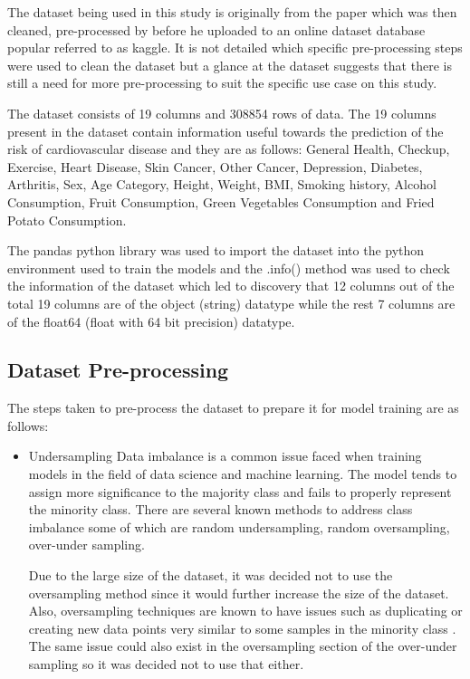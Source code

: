 \documentclass[12pt, a4paper,twoside]{report}
\numberwithin{equation}{chapter}
\begin{document}
The dataset being used in this study is originally from the paper \parencite{subramani_varshney2023} which was then cleaned, pre-processed by \parencite{harshwardhanfartale_2023} before he uploaded to an online dataset database popular referred to as kaggle. It is not detailed which specific pre-processing steps were used to clean the dataset but a glance at the dataset suggests that there is still a need for more pre-processing to suit the specific use case on this study.

The dataset consists of 19 columns and 308854 rows of data. The 19 columns present in the dataset contain information useful towards the prediction of the risk of cardiovascular disease and they are as follows: General Health, Checkup, Exercise, Heart Disease, Skin Cancer, Other Cancer, Depression, Diabetes, Arthritis, Sex, Age Category, Height, Weight, BMI, Smoking history, Alcohol Consumption, Fruit Consumption, Green Vegetables Consumption and Fried Potato Consumption. 

The pandas python library was used to import the dataset into the python environment used to train the models and the .info() method was used to check the information of the dataset which led to discovery that 12 columns out of the total 19 columns are of the object (string) datatype while the rest 7 columns are of the float64 (float with 64 bit precision) datatype. 


\subsection{Dataset Pre-processing}
The steps taken to pre-process the dataset to prepare it for model training are as follows:

\begin{itemize}
    \item Undersampling
    Data imbalance is a common issue faced when training models in the field of data science and machine learning. The model tends to assign more significance to the majority class and fails to properly represent the minority class. There are several known methods to address class imbalance some of which are random undersampling, random oversampling, over-under sampling.

    Due to the large size of the dataset, it was decided not to use the oversampling method since it would further increase the size of the dataset. Also, oversampling techniques are known to have issues such as duplicating or creating new data points very similar to some samples in the minority class \parencite{Ali2019}. The same issue could also exist in the oversampling section of the over-under sampling so it was decided not to use that either.

\end{itemize}
\end{document}

